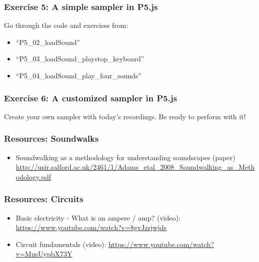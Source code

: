 \documentclass[screen, aspectratio=43]{beamer}
\begin{document}
%
\begin{frame}
  \frametitle{Exercise 5: A simple sampler in P5.js}
  Go through the code and exercises from: 
   \begin{itemize}
  	\item ``P5\_02\_loadSound''
	\item ``P5\_03\_loadSound\_playstop\_keyboard'' 
	\item ``P5\_04\_loadSound\_play\_four\_sounds''
   \end{itemize}
  
  
\end{frame}
%
\begin{frame}
  \frametitle{Exercise 6: A customized sampler in P5.js}
  Create your own sampler with today's recordings. Be ready to perform with it!
\end{frame}
%
\begin{frame}
  \frametitle{Resources: Soundwalks}
    \begin{itemize}
	\item Soundwalking as a methodology for understanding soundscapes (paper)\\ 
	\url{http://usir.salford.ac.uk/2461/1/Adams_etal_2008_Soundwalking_as_Methodology.pdf}
    \end{itemize}    
\end{frame}
%
\begin{frame}
  \frametitle{Resources: Circuits}
    \begin{itemize}
    \item Basic electricity - What is an ampere / amp? (video): \url{https://www.youtube.com/watch?v=8gvJzrjwjds}
    \item Circuit fundamentals (video): \url{https://www.youtube.com/watch?v=MusUypbX73Y}
    \end{itemize}    
\end{frame}
%
\end{document}
